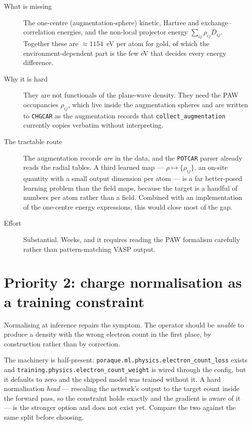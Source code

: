 \documentclass[11pt,a4paper]{report}
\newcommand{\file}[1]{\texttt{#1}}
\newcommand{\opt}[1]{\texttt{#1}}
\newcommand{\pyclass}[1]{\texttt{#1}}
\begin{document}
\begin{description}
\item[What is missing] The one-centre (augmentation-sphere) kinetic, Hartree
  and exchange--correlation energies, and the non-local projector energy
  $\sum_{ij}\rho_{ij}D_{ij}$. Together these are $\approx 1154$~eV per atom for
  gold, of which the environment-dependent part is the few eV that decides
  every energy difference.
\item[Why it is hard] They are not functionals of the plane-wave density. They
  need the PAW occupancies $\rho_{ij}$, which live inside the augmentation
  spheres and are written to \file{CHGCAR} as the augmentation records that
  \pyclass{collect\_augmentation} currently copies verbatim without
  interpreting.
\item[The tractable route] The augmentation records \emph{are} in the data, and
  the \file{POTCAR} parser already reads the radial tables. A third learned map
  --- $\rho \mapsto \{\rho_{ij}\}$, an on-site quantity with a small output
  dimension per atom --- is a far better-posed learning problem than the field
  maps, because the target is a handful of numbers per atom rather than a
  field. Combined with an implementation of the one-centre energy expressions,
  this would close most of the gap.
\item[Effort] Substantial. Weeks, and it requires reading the PAW formalism
  carefully rather than pattern-matching VASP output.
\end{description}

\section{Priority 2: charge normalisation as a training constraint}

Normalising at inference repairs the symptom. The operator should be
\emph{unable} to produce a density with the wrong electron count in the first
place, by construction rather than by correction.

\begin{ptip}
The machinery is half-present: \pyclass{poraque.ml.physics.electron\_count\_loss}
exists and \opt{training.physics.electron\_count\_weight} is wired through the
config, but it defaults to zero and the shipped model was trained without it.
A hard normalisation \emph{head} --- rescaling the network's output to the
target count inside the forward pass, so the constraint holds exactly and the
gradient is aware of it --- is the stronger option and does not exist yet.
Compare the two against the same split before choosing.
\end{ptip}
\end{document}
